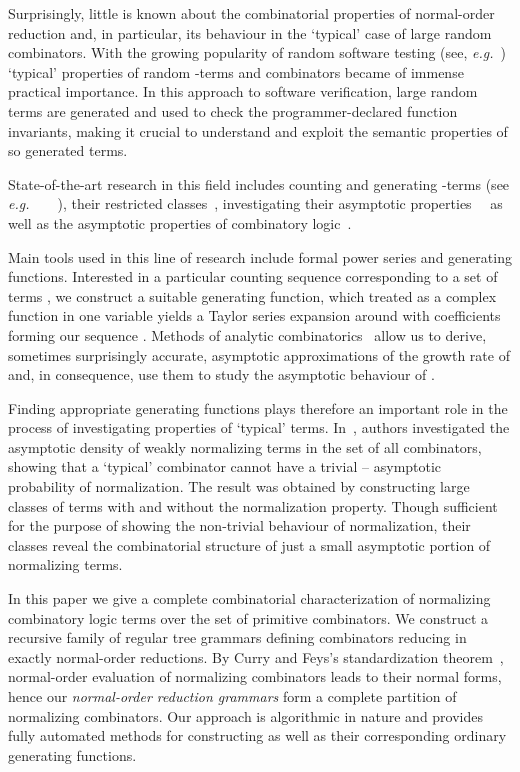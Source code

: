 \documentclass[11pt,a4paper]{amsart}
\newcommand\eg{\emph{e.g.}\ }
\theoremstyle{definition}
\begin{document}
Surprisingly, little is known about the combinatorial properties of normal-order reduction and, in particular, its behaviour in the `typical' case of large random combinators. With the growing popularity of random software testing (see, \eg \cite{DBLP:conf/icse/PalkaCRH11}) `typical' properties of random -terms and combinators became of immense practical importance. In this approach to software verification, large random terms are generated and used to check the programmer-declared function invariants, making it crucial to understand and exploit the semantic properties of so generated terms. 

State-of-the-art research in this field includes counting and generating -terms (see \eg~\cite{DBLP:journals/jfp/GrygielL13}~\cite{DBLP:journals/corr/Lescanne14}~\cite{DBLP:conf/stacs/GittenbergerG16}), their restricted classes~\cite{1510.01167}, investigating their asymptotic properties~\cite{lmcs:848}~\cite{Bendkowski2016} as well as the asymptotic properties of combinatory logic~\cite{Bendkowski2015}. 

Main tools used in this line of research include formal power series and generating functions. Interested in a particular counting sequence  corresponding to a set of terms , we construct a suitable generating function, which treated as a complex function in one variable  yields a Taylor series expansion around  with coefficients forming our sequence . Methods of analytic combinatorics~\cite{Flajolet:2009:AC:1506267} allow us to derive, sometimes surprisingly accurate, asymptotic approximations of the growth rate of  and, in consequence, use them to study the asymptotic behaviour of . 

Finding appropriate generating functions plays therefore an important role in the process of investigating properties of `typical' terms. In~\cite{Bendkowski2015}, authors investigated the asymptotic density of weakly normalizing terms in the set of all combinators, showing that a `typical' combinator cannot have a trivial  --  asymptotic probability of normalization. The result was obtained by constructing large classes of terms with and without the normalization property. Though sufficient for the purpose of showing the non-trivial behaviour of normalization, their classes reveal the combinatorial structure of just a small asymptotic portion of normalizing terms.

In this paper we give a complete combinatorial characterization of normalizing combinatory logic terms over the set  of primitive combinators. We construct a recursive family  of regular tree grammars defining combinators reducing in exactly  normal-order reductions. By Curry and Feys's standardization theorem~\cite{curry-feys1958}, normal-order evaluation of normalizing combinators leads to their normal forms, hence our \emph{normal-order reduction grammars} form a complete partition of normalizing combinators. Our approach is algorithmic in nature and provides fully automated methods for constructing  as well as their corresponding ordinary generating functions.
\end{document}
